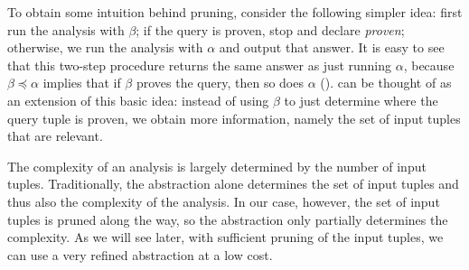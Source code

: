To obtain some intuition behind pruning,
consider the following simpler idea:
first run the analysis with $\beta$; if the query is proven, stop and declare {\em proven}; otherwise, we run the analysis
with $\alpha$ and output that answer.
It is easy to see that this two-step procedure returns the same answer as just running $\alpha$,
because $\beta \preceq \alpha$ implies that if $\beta$ proves the query, then so does $\alpha$
().
 can be thought of as an extension of this basic idea:
instead of using $\beta$ to just determine where the query tuple is proven,
we obtain more information, namely the set of input tuples that are relevant.

The complexity of an analysis is largely determined by the number of input
tuples.  Traditionally, the abstraction alone determines the set of input
tuples and thus also the complexity of the analysis.  In our case, however, the set
of input tuples is pruned along the way, so the abstraction only partially
determines the complexity.  As we will see later, with sufficient pruning of
the input tuples, we can use a very refined abstraction at a low cost.


